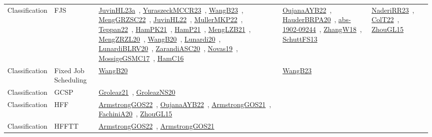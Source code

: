{\begin{longtable}{lp{3cm}>{\raggedright\arraybackslash}p{6cm}>{\raggedright\arraybackslash}p{6cm}>{\raggedright\arraybackslash}p{8cm}}
Classification & FJS & \href{../works/JuvinHL23a.pdf}{JuvinHL23a}~\cite{JuvinHL23a}, \href{../works/YuraszeckMCCR23.pdf}{YuraszeckMCCR23}~\cite{YuraszeckMCCR23}, \href{../works/WangB23.pdf}{WangB23}~\cite{WangB23}, \href{../works/MengGRZSC22.pdf}{MengGRZSC22}~\cite{MengGRZSC22}, \href{../works/JuvinHL22.pdf}{JuvinHL22}~\cite{JuvinHL22}, \href{../works/MullerMKP22.pdf}{MullerMKP22}~\cite{MullerMKP22}, \href{../works/Teppan22.pdf}{Teppan22}~\cite{Teppan22}, \href{../works/HamPK21.pdf}{HamPK21}~\cite{HamPK21}, \href{../works/HamP21.pdf}{HamP21}~\cite{HamP21}, \href{../works/MengLZB21.pdf}{MengLZB21}~\cite{MengLZB21}, \href{../works/MengZRZL20.pdf}{MengZRZL20}~\cite{MengZRZL20}, \href{../works/WangB20.pdf}{WangB20}~\cite{WangB20}, \href{../works/Lunardi20.pdf}{Lunardi20}~\cite{Lunardi20}, \href{../works/LunardiBLRV20.pdf}{LunardiBLRV20}~\cite{LunardiBLRV20}, \href{../works/ZarandiASC20.pdf}{ZarandiASC20}~\cite{ZarandiASC20}, \href{../works/Novas19.pdf}{Novas19}~\cite{Novas19}, \href{../works/MossigeGSMC17.pdf}{MossigeGSMC17}~\cite{MossigeGSMC17}, \href{../works/HamC16.pdf}{HamC16}~\cite{HamC16} & \href{../works/OujanaAYB22.pdf}{OujanaAYB22}~\cite{OujanaAYB22}, \href{../works/HauderBRPA20.pdf}{HauderBRPA20}~\cite{HauderBRPA20}, \href{../works/abs-1902-09244.pdf}{abs-1902-09244}~\cite{abs-1902-09244}, \href{../works/ZhangW18.pdf}{ZhangW18}~\cite{ZhangW18}, \href{../works/SchuttFS13.pdf}{SchuttFS13}~\cite{SchuttFS13} & \href{../works/NaderiRR23.pdf}{NaderiRR23}~\cite{NaderiRR23}, \href{../works/ColT22.pdf}{ColT22}~\cite{ColT22}, \href{../works/ZhouGL15.pdf}{ZhouGL15}~\cite{ZhouGL15}\\
Classification & Fixed Job Scheduling & \href{../works/WangB20.pdf}{WangB20}~\cite{WangB20} & \href{../works/WangB23.pdf}{WangB23}~\cite{WangB23} & \\
Classification & GCSP & \href{../works/Groleaz21.pdf}{Groleaz21}~\cite{Groleaz21}, \href{../works/GroleazNS20.pdf}{GroleazNS20}~\cite{GroleazNS20} &  & \\
Classification & HFF & \href{../works/ArmstrongGOS22.pdf}{ArmstrongGOS22}~\cite{ArmstrongGOS22}, \href{../works/OujanaAYB22.pdf}{OujanaAYB22}~\cite{OujanaAYB22}, \href{../works/ArmstrongGOS21.pdf}{ArmstrongGOS21}~\cite{ArmstrongGOS21}, \href{../works/FachiniA20.pdf}{FachiniA20}~\cite{FachiniA20}, \href{../works/ZhouGL15.pdf}{ZhouGL15}~\cite{ZhouGL15} &  & \\
Classification & HFFTT & \href{../works/ArmstrongGOS22.pdf}{ArmstrongGOS22}~\cite{ArmstrongGOS22}, \href{../works/ArmstrongGOS21.pdf}{ArmstrongGOS21}~\cite{ArmstrongGOS21} &  & \\

\end{longtable}}
